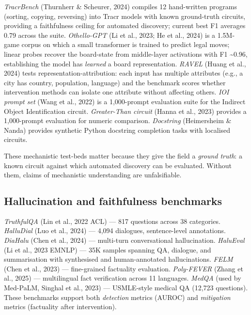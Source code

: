 \emph{TracrBench} (Thurnherr \& Scheurer, 2024) compiles 12 hand-written programs (sorting, copying, reversing) into Tracr models with known ground-truth circuits, providing a faithfulness ceiling for automated discovery; current best F1 averages 0.79 across the suite. \emph{Othello-GPT} (Li et al., 2023; He et al., 2024) is a 1.5M-game corpus on which a small transformer is trained to predict legal moves; linear probes recover the board-state from middle-layer activations with F1 \textasciitilde0.96, establishing the model has \emph{learned} a board representation. \emph{RAVEL} (Huang et al., 2024) tests representation-attribution: each input has multiple attributes (e.g., a city has country, population, language) and the benchmark scores whether intervention methods can isolate one attribute without affecting others. \emph{IOI prompt set} (Wang et al., 2022) is a 1,000-prompt evaluation suite for the Indirect Object Identification circuit. \emph{Greater-Than circuit} (Hanna et al., 2023) provides a 1,000-prompt evaluation for numeric comparison. \emph{Docstring} (Heimersheim \& Nanda) provides synthetic Python docstring completion tasks with localised circuits.

These mechanistic test-beds matter because they give the field a \emph{ground truth}: a known circuit against which automated discovery can be evaluated. Without them, claims of mechanistic understanding are unfalsifiable.

\subsection{Hallucination and faithfulness benchmarks}\label{hallucination-and-faithfulness-benchmarks}

\emph{TruthfulQA} (Lin et al., 2022 ACL) --- 817 questions across 38 categories. \emph{HalluDial} (Luo et al., 2024) --- 4,094 dialogues, sentence-level annotations. \emph{DiaHalu} (Chen et al., 2024) --- multi-turn conversational hallucination. \emph{HaluEval} (Li et al., 2023 EMNLP) --- 35K samples spanning QA, dialogue, and summarisation with synthesised and human-annotated hallucinations. \emph{FELM} (Chen et al., 2023) --- fine-grained factuality evaluation. \emph{Poly-FEVER} (Zhang et al., 2025) --- multilingual fact verification across 11 languages. \emph{MedQA} (used by Med-PaLM, Singhal et al., 2023) --- USMLE-style medical QA (12,723 questions). These benchmarks support both \emph{detection} metrics (AUROC) and \emph{mitigation} metrics (factuality after intervention).

